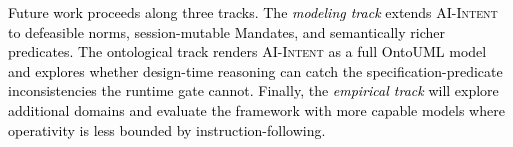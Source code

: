 \documentclass[runningheads]{llncs}
\begin{document}
\textcolor{black}{Future work proceeds along three tracks. The \textit{modeling track} extends \textsc{AI-Intent} to defeasible norms, session-mutable Mandates, and semantically richer predicates. The ontological track renders \textsc{AI-Intent} as a full OntoUML model and explores whether design-time reasoning can catch the specification-predicate inconsistencies the runtime gate cannot. Finally, the \textit{empirical track} will explore additional domains and evaluate the framework with more capable models where operativity is less bounded by instruction-following.}




\end{document}
